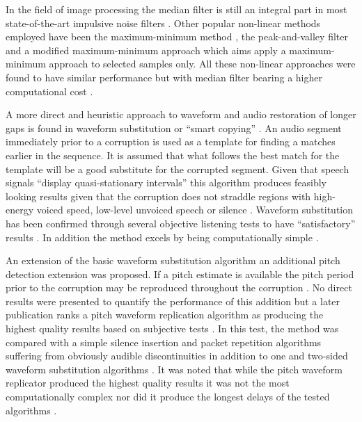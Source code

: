 In the field of image processing the median filter is still an integral part in most state-of-the-art impulsive noise filters \cite{Alajlan2004}. Other popular non-linear methods employed have been the maximum-minimum method \cite{Xu1998}, the peak-and-valley filter\linebreak[2]\cite{Windyga2001} and a modified maximum-minimum approach \cite{Alajlan2004} which aims apply a maximum-minimum approach to selected samples only. All these non-linear approaches were found to have similar performance but with median filter bearing a higher computational cost \cite{Alajlan2004}.

A more direct and heuristic approach to waveform and audio restoration of longer gaps is found in waveform substitution \cite{Goodman1986} or ``smart copying'' \cite{Niediwiecki2001}. An audio segment immediately prior to a corruption is used as a template for finding a matches earlier in the sequence. It is assumed that what follows the best match for the template will be a good substitute for the corrupted segment. Given that speech signals ``display quasi-stationary intervals'' \cite{Goodman1986} this algorithm produces feasibly looking results given that the corruption does not straddle regions with high-energy voiced speed, low-level unvoiced speech or silence \cite{Goodman1986}. Waveform substitution has been confirmed through several objective listening tests to have ``satisfactory'' results \cite{Niediwiecki2001}. In addition the method excels by being computationally simple \cite{Niediwiecki2001}.

An extension of the basic waveform substitution algorithm an additional pitch detection extension was proposed. If a pitch estimate is available the pitch period prior to the corruption may be reproduced throughout the corruption \cite{Goodman1986}. No direct results were presented to quantify the performance of this addition but a later publication ranks a pitch waveform replication algorithm as producing the highest quality results based on subjective tests \cite{Wasem1988}. In this test, the method was compared with a simple silence insertion and packet repetition algorithms suffering from obviously audible discontinuities \cite{Goodman1986} in addition to one and two-sided waveform substitution algorithms \cite{Goodman1986}. It was noted that while the pitch waveform replicator produced the highest quality results it was not the most computationally complex nor did it produce the longest delays of the tested algorithms \cite{Wasem1988}.

